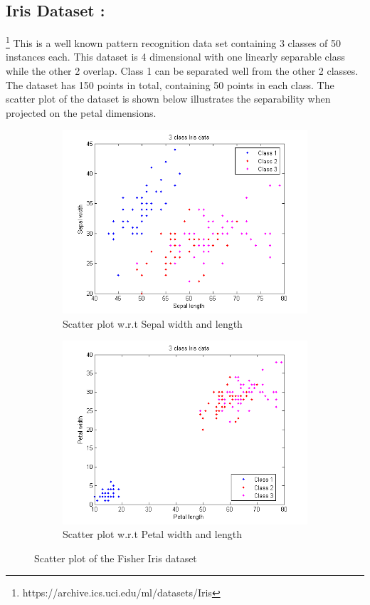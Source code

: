 \documentclass{article} %
\begin{document}
\subsection{Iris Dataset :} \footnote{https://archive.ics.uci.edu/ml/datasets/Iris}
This is a well known pattern recognition data set containing 3 classes of 50 instances each. This dataset is 4 dimensional with one linearly separable class while the other 2 overlap. Class 1 can be separated well from the other 2 classes. The dataset has 150 points in total, containing 50 points in each class.
The scatter plot of the dataset is shown below illustrates the separability when projected on the petal dimensions.


\begin{figure}
\begin{subfigure}{.5\textwidth}
  \centering
  \includegraphics[width=\linewidth]{../Code/FisherIris/svdd/iris_1}
\caption{Scatter plot w.r.t Sepal width and length} 
\end{subfigure}%
\begin{subfigure}{.5\textwidth}
  \centering
  \includegraphics[width=\linewidth]{../Code/FisherIris/svdd/iris_2}
\caption{Scatter plot w.r.t Petal width and length}  
\end{subfigure}
\caption{Scatter plot of the Fisher Iris dataset}
\end{figure}
\end{document}
